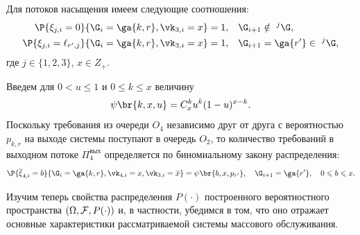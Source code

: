 Для потоков насыщения имеем следующие соотношения:
\begin{align}
\P{\xi_{j,i} = 0}{\G_i=\ga{k,r}, \vk_{3,i} = x} = 1, &\quad \G_{i+1} \notin~^j\G,\\
\P{\xi_{j,i} = \ell_{r',j}}{\G_i=\ga{k,r}, \vk_{3,i} = x} = 1, &\quad \G_{i+1}=\ga{r'}\in~^j\G,
\end{align}
где $j\in \{1, 2, 3\}$, $x \in Z_+$.


Введем для $0 < u \leqslant 1$ и $0 \leqslant k \leqslant x$ величину
\begin{equation}
\psi\br{k,x,u} = C_x^k u^k (1-u)^{x-k}.
\end{equation}
Поскольку требования из очереди $O_4$ независимо друг от друга с вероятностью $p_{k,r}$ на выходе системы поступают в очередь $O_2$, то количество требований в выходном потоке $\Pi_4^{\mathrm{\text{вых}}}$ определяется по биномиальному закону распределения:
\begin{equation}
\P{\overline{\xi}_{4,i} = b}{ \G_i = \ga{k,r}, \vk_{4,i}=x, \vk_{3,i}=\tilde{x}}=\psi\br{b,x,p_{r'}}, \quad \G_{i+1}=\ga{r'}, \quad 0 \leqslant b \leqslant x.
\end{equation}












































Изучим теперь свойства распределения $P(\cdot)$ построенного вероятностного пространства $(\Omega,{\cal F},P(\cdot))$ и, в частности, убедимся в том, что оно отражает основные характеристики рассматриваемой системы массового обслуживания.

